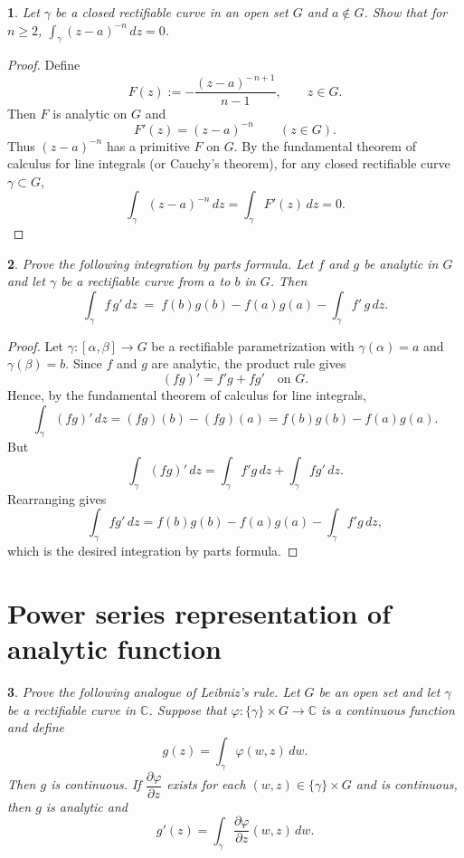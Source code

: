 \documentclass[12pt, a4paper]{report}
\theoremstyle{spaced}
\newtheorem{exercise}{}
\newcommand{\setexercise}[1]{\setcounter{exercise}{#1-1}}
\begin{document}
\setexercise{22}
\begin{exercise}
	Let $\gamma$ be a closed rectifiable curve in an open set $G$ and $a\notin G$. Show that for $n\ge 2$, $\displaystyle\int_\gamma (z-a)^{-n}\,dz=0$.
\end{exercise}

\begin{proof}
	Define
	\[
		F(z) := -\frac{(z-a)^{-\,n+1}}{\,n-1\,}, \qquad z \in G.
	\]
	Then \(F\) is analytic on \(G\) and
	\[
		F'(z) = (z-a)^{-n} \qquad (z \in G).
	\]
	Thus \((z-a)^{-n}\) has a primitive \(F\) on \(G\). By the fundamental theorem of
	calculus for line integrals (or Cauchy's theorem), for any closed rectifiable
	curve \(\gamma \subset G\),
	\[
		\int_\gamma (z-a)^{-n}\,dz
		= \int_\gamma F'(z)\,dz
		= 0.
	\]
\end{proof}

\setexercise{23}
\begin{exercise}
	Prove the following integration by parts formula. Let $f$ and $g$ be analytic in $G$ and let $\gamma$ be a rectifiable curve from $a$ to $b$ in $G$. Then
	\[
		\int_{\gamma} f\,g' \, dz \;=\; f(b)g(b)-f(a)g(a)-\int_{\gamma} f'\,g \, dz.
	\]
\end{exercise}

\begin{proof}
	Let \(\gamma:[\alpha,\beta]\to G\) be a rectifiable parametrization with
	\(\gamma(\alpha)=a\) and \(\gamma(\beta)=b\).
	Since \(f\) and \(g\) are analytic, the product rule gives
	\[
		(fg)' = f'g + fg' \quad \text{on } G.
	\]
	Hence, by the fundamental theorem of calculus for line integrals,
	\[
		\int_\gamma (fg)' \, dz
		= (fg)(b) - (fg)(a)
		= f(b)g(b) - f(a)g(a).
	\]
	But
	\[
		\int_\gamma (fg)'\,dz
		= \int_\gamma f'g \, dz + \int_\gamma fg' \, dz.
	\]
	Rearranging gives
	\[
		\int_\gamma fg' \, dz
		= f(b)g(b) - f(a)g(a) - \int_\gamma f'g \, dz,
	\]
	which is the desired integration by parts formula.
\end{proof}


\section{Power series representation of analytic function}
\setexercise{2}
\begin{exercise}
	Prove the following analogue of Leibniz's rule.
	Let $G$ be an open set and let $\gamma$ be a rectifiable curve in $\mathbb{C}$.
	Suppose that $\varphi : \{\gamma\} \times G \to \mathbb{C}$ is a continuous function and define
	\[
		g(z) = \int_{\gamma} \varphi(w,z)\,dw.
	\]
	Then $g$ is continuous. If $\dfrac{\partial \varphi}{\partial z}$ exists for each $(w,z) \in \{\gamma\} \times G$ and is continuous,
	then $g$ is analytic and
	\[
		g'(z) = \int_{\gamma} \frac{\partial \varphi}{\partial z}(w,z)\,dw.
	\]
\end{exercise}
\end{document}
